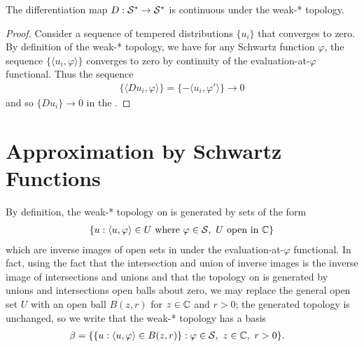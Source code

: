   \begin{claim}
    The differentiation map $D:\mathcal{S}^*\rightarrow\mathcal{S}^*$ is continuous under the weak-* topology.
  \end{claim}
  \begin{proof}
    Consider a sequence of tempered distributions $\{u_i\}$ that converges to zero.
    By definition of the weak-* topology, we have for any Schwartz function $\varphi$, the sequence $\{\langle u_i,\varphi\rangle\}$ converges to zero by continuity of the evaluation-at-$\varphi$ functional.
    Thus the sequence 
    \begin{align*}
      \{\langle Du_i, \varphi\rangle\} = \{-\langle u_i, \varphi'\rangle\} \rightarrow 0
    \end{align*}
    and so $\{Du_i\}\rightarrow 0$ in the \ws.
  \end{proof}

  \section{Approximation by Schwartz Functions}
    By definition, the weak-* topology on \SS is generated by sets of the form 
    \begin{align*}
      \{u:\langle u,\varphi\rangle \in U\text{ where }\varphi\in\mathcal{S},~U\text{ open in }\mathbb{C}\}
    \end{align*}
    which are inverse images of open sets in \C under the evaluation-at-$\varphi$ functional.
    In fact, using the fact that the intersection and union of inverse images is the inverse image of intersections and unions and that the topology on \C is generated by unions and intersections open balls about zero, we may replace the general open set $U$ with an open ball $B(z,r)$ for $z\in\mathbb{C}$ and $r>0$; the generated topology is unchanged, so we write that the weak-* topology has a basis
    \begin{align*}
      \beta &=
      \{\{u:\langle u,\varphi\rangle \in B(z,r)\}:\varphi\in\mathcal{S},~z\in\mathbb{C},~r>0 \}\text{.}
    \end{align*}

